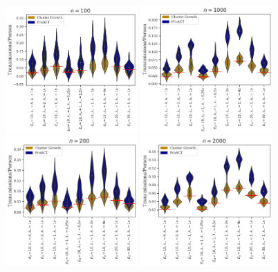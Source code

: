 \documentclass[a4paper,11pt]{article}
\begin{document}
\begin{figure}[!h]
\centering
\includegraphics[width=0.45\textwidth]{figs/results_efficacy_individual_n100.pdf}
\includegraphics[width=0.45\textwidth]{figs/results_efficacy_individual_n1000.pdf}\\
\includegraphics[width=0.45\textwidth]{figs/results_efficacy_individual_n200.pdf}
\includegraphics[width=0.45\textwidth]{figs/results_efficacy_individual_n2000.pdf}\\

\end{figure}
\end{document}
